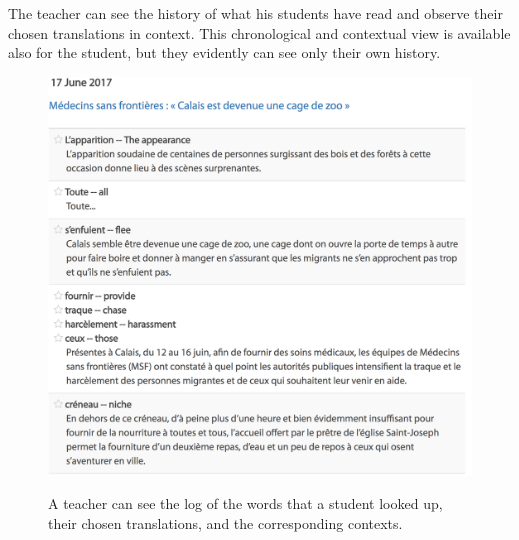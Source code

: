 The teacher can see the history of what his students have read and observe their chosen translations in context. This chronological and contextual view is available also for the student, but they evidently can see only their own history.

\begin{figure}[h!]
\centering
  \includegraphics[width=\columnwidth]{figures/teacher_dashboard.png}
  \caption{A teacher can see the log of the words that a student looked up, their chosen translations, and the corresponding contexts.}{
  \label{exercise_translate}
  }
\end{figure}





